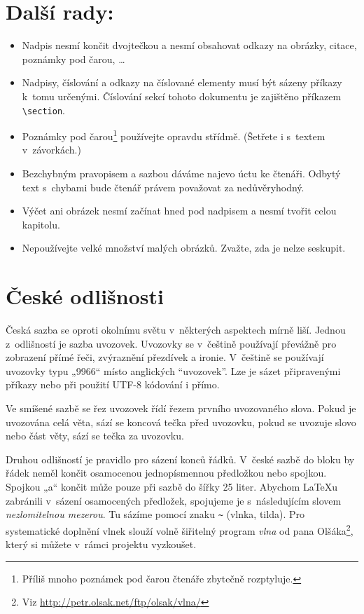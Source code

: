 \documentclass[twocolumn, 10pt, a4paper]{article}
\begin{document}
\section{Další rady:}
\label{section:treti_sekce}
\begin{itemize}
\item Nadpis nesmí končit dvojtečkou a nesmí obsahovat odkazy na obrázky, citace, poznámky pod čarou, \dots

\item Nadpisy, číslování a odkazy na číslované elementy musí být sázeny příkazy k~tomu určenými.
Číslování sekcí tohoto dokumentu je zajištěno příkazem \verb|\section|.

\item Poznámky pod čarou\footnote{Příliš mnoho poznámek pod čarou čtenáře zbytečně rozptyluje.} používejte opravdu střídmě.
(Šetřete i s~textem v~závorkách.)

\item Bezchybným pravopisem a sazbou dáváme najevo úctu ke čtenáři.
Odbytý text s~chybami bude čtenář právem považovat za nedůvěryhodný.

\item Výčet ani obrázek nesmí začínat hned pod nadpisem a nesmí tvořit celou kapitolu.

\item Nepoužívejte velké množství malých obrázků. Zvažte, zda je nelze seskupit.
\end{itemize}

\section{České odlišnosti}
Česká sazba se oproti okolnímu světu v~některých aspektech mírně liší.
Jednou z~odlišností je sazba uvozovek.
Uvozovky se v~češtině používají převážně pro zobrazení přímé řeči, zvýraznění přezdívek a ironie.
V~češtině se používají uvozovky typu „9966“ místo anglických ``uvozovek''.
Lze je sázet připravenými příkazy nebo při použití UTF-8 kódování i přímo.

Ve smíšené sazbě se řez uvozovek řídí řezem prvního uvozovaného slova.
Pokud je uvozována celá věta, sází se koncová tečka před uvozovku, pokud se uvozuje slovo nebo část věty, sází se tečka za uvozovku.

Druhou odlišností je pravidlo pro sázení konců řádků.
V~české sazbě do bloku by řádek neměl končit osamocenou jednopísmennou předložkou nebo spojkou.
Spojkou „a“ končit může pouze při sazbě do šířky 25 liter.
Abychom \LaTeX u zabránili v~sázení osamocených předložek, spojujeme je s~následujícím slovem \emph{nezlomitelnou mezerou}.
Tu sázíme pomocí znaku \verb|~| (vlnka, tilda).
Pro systematické doplnění vlnek slouží volně šiřitelný program \emph{vlna} od pana Olšáka\footnote{Viz \url{http://petr.olsak.net/ftp/olsak/vlna/}}, který si můžete v~rámci projektu vyzkoušet.
\end{document}
